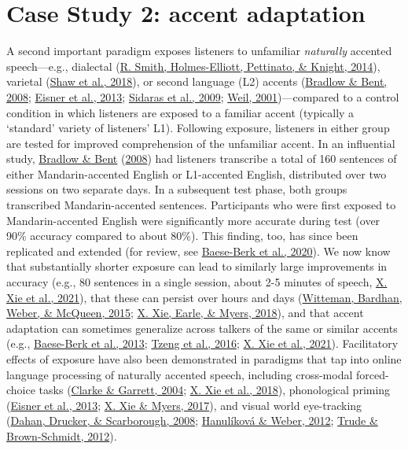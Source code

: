 \documentclass[
  11pt,
  english,
  man,floatsintext]{apa6}
\begin{document}
\hypertarget{case-study-2-accent-adaptation}{%
\section{Case Study 2: accent adaptation}\label{case-study-2-accent-adaptation}}

A second important paradigm exposes listeners to unfamiliar \emph{naturally} accented speech---e.g., dialectal (\protect\hyperlink{ref-smith2014}{R. Smith, Holmes-Elliott, Pettinato, \& Knight, 2014}), varietal (\protect\hyperlink{ref-shaw2018}{Shaw et al., 2018}), or second language (L2) accents (\protect\hyperlink{ref-bradlow-bent2008}{Bradlow \& Bent, 2008}; \protect\hyperlink{ref-eisner2013}{Eisner et al., 2013}; \protect\hyperlink{ref-sidaras2009}{Sidaras et al., 2009}; \protect\hyperlink{ref-weil2001a}{Weil, 2001})---compared to a control condition in which listeners are exposed to a familiar accent (typically a `standard' variety of listeners' L1). Following exposure, listeners in either group are tested for improved comprehension of the unfamiliar accent. In an influential study, \protect\hyperlink{ref-bradlow-bent2008}{Bradlow \& Bent} (\protect\hyperlink{ref-bradlow-bent2008}{2008}) had listeners transcribe a total of 160 sentences of either Mandarin-accented English or L1-accented English, distributed over two sessions on two separate days. In a subsequent test phase, both groups transcribed Mandarin-accented sentences. Participants who were first exposed to Mandarin-accented English were significantly more accurate during test (over 90\% accuracy compared to about 80\%). This finding, too, has since been replicated and extended (for review, see \protect\hyperlink{ref-baeseberk2020}{Baese-Berk et al., 2020}). We now know that substantially shorter exposure can lead to similarly large improvements in accuracy (e.g., 80 sentences in a single session, about 2-5 minutes of speech, \protect\hyperlink{ref-xie2021jep}{X. Xie et al., 2021}), that these can persist over hours and days (\protect\hyperlink{ref-witteman2015}{Witteman, Bardhan, Weber, \& McQueen, 2015}; \protect\hyperlink{ref-xie2018lcn}{X. Xie, Earle, \& Myers, 2018}), and that accent adaptation can sometimes generalize across talkers of the same or similar accents (e.g., \protect\hyperlink{ref-baeseberk2013}{Baese-Berk et al., 2013}; \protect\hyperlink{ref-tzeng2016}{Tzeng et al., 2016}; \protect\hyperlink{ref-xie2021jep}{X. Xie et al., 2021}). Facilitatory effects of exposure have also been demonstrated in paradigms that tap into online language processing of naturally accented speech, including cross-modal forced-choice tasks (\protect\hyperlink{ref-clarke-garrett2004}{Clarke \& Garrett, 2004}; \protect\hyperlink{ref-xie2018jasa}{X. Xie et al., 2018}), phonological priming (\protect\hyperlink{ref-eisner2013}{Eisner et al., 2013}; \protect\hyperlink{ref-xie2017}{X. Xie \& Myers, 2017}), and visual world eye-tracking (\protect\hyperlink{ref-dahan2008}{Dahan, Drucker, \& Scarborough, 2008}; \protect\hyperlink{ref-hanulikova-weber2012}{Hanulíková \& Weber, 2012}; \protect\hyperlink{ref-trude2012talker}{Trude \& Brown-Schmidt, 2012}).
\end{document}
